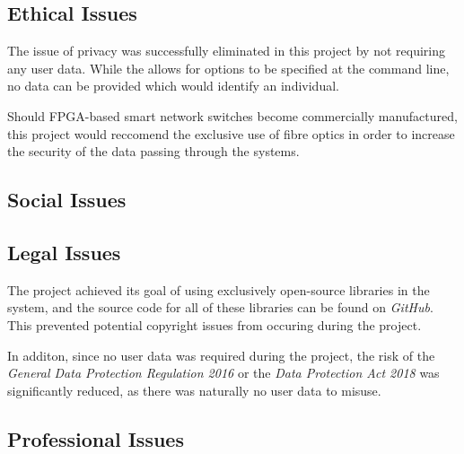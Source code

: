 
\subsection{Ethical Issues}
The issue of privacy was successfully eliminated in this project by not requiring any user data. While the allows for options to be specified at the command line, no data can be provided which would identify an individual.

Should FPGA-based smart network switches become commercially manufactured, this project would reccomend the exclusive use of fibre optics in order to increase the security of the data passing through the systems.

\subsection{Social Issues}


\subsection{Legal Issues}
The project achieved its goal of using exclusively open-source libraries in the system, and the source code for all of these libraries can be found on \textit{GitHub}.
This prevented potential copyright issues from occuring during the project.

In additon, since no user data was required during the project, the risk of the \textit{General Data Protection Regulation 2016} \cite{eu_2016_679} or the \textit{Data Protection Act 2018} \cite{uk_dpa_2018} was significantly reduced, as there was naturally no user data to misuse.

\subsection{Professional Issues}
